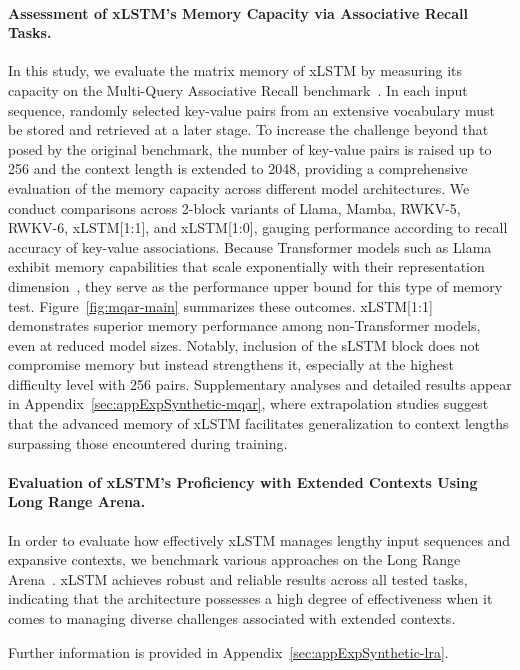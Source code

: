 \paragraph{Assessment of xLSTM's Memory Capacity via Associative Recall Tasks.} In this study, we evaluate the matrix memory of xLSTM by measuring its capacity on the Multi-Query Associative Recall benchmark~\citep{Arora:23arxiv}. In each input sequence, randomly selected key-value pairs from an extensive vocabulary must be stored and retrieved at a later stage. To increase the challenge beyond that posed by the original benchmark, the number of key-value pairs is raised up to 256 and the context length is extended to 2048, providing a comprehensive evaluation of the memory capacity across different model architectures. We conduct comparisons across 2-block variants of Llama, Mamba, RWKV-5, RWKV-6, xLSTM[1:1], and xLSTM[1:0], gauging performance according to recall accuracy of key-value associations. Because Transformer models such as Llama exhibit memory capabilities that scale exponentially with their representation dimension~\citep{Ramsauer:21}, they serve as the performance upper bound for this type of memory test. Figure~\ref{fig:mqar-main} summarizes these outcomes. xLSTM[1:1] demonstrates superior memory performance among non-Transformer models, even at reduced model sizes. Notably, inclusion of the sLSTM block does not compromise memory but instead strengthens it, especially at the highest difficulty level with 256 pairs. Supplementary analyses and detailed results appear in Appendix~\ref{sec:appExpSynthetic-mqar}, where extrapolation studies suggest that the advanced memory of xLSTM facilitates generalization to context lengths surpassing those encountered during training.

\paragraph{Evaluation of xLSTM's Proficiency with Extended Contexts Using Long Range Arena.} In order to evaluate how effectively xLSTM manages lengthy input sequences and expansive contexts, we benchmark various approaches on the Long Range Arena~\citep{Tay:21}. xLSTM achieves robust and reliable results across all tested tasks, indicating that the architecture possesses a high degree of effectiveness when it comes to managing diverse challenges associated with extended contexts.

Further information is provided in Appendix~\ref{sec:appExpSynthetic-lra}.

